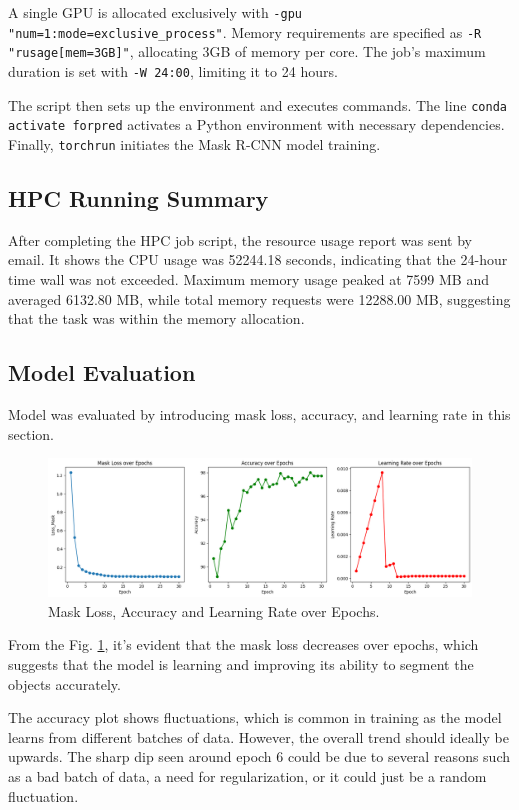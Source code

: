 A single GPU is allocated exclusively with \texttt{-gpu "num=1:mode=exclusive\_process"}. Memory requirements are specified as \texttt{-R "rusage[mem=3GB]"}, allocating 3GB of memory per core. The job's maximum duration is set with \texttt{-W 24:00}, limiting it to 24 hours.

The script then sets up the environment and executes commands. The line \texttt{conda activate forpred} activates a Python environment with necessary dependencies. Finally, \texttt{torchrun} initiates the Mask R-CNN model training.

\subsection{HPC Running Summary}
After completing the HPC job script, the resource usage report was sent by email. It shows the CPU usage was 52244.18 seconds, indicating that the 24-hour time wall was not exceeded. Maximum memory usage peaked at 7599 MB and averaged 6132.80 MB, while total memory requests were 12288.00 MB, suggesting that the task was within the memory allocation.

\subsection{Model Evaluation}

Model was evaluated by introducing mask loss, accuracy, and learning rate in this section.

\begin{figure}[H]
    \centering
    \includegraphics[width=.9\textwidth]{Pictures/maskrcnn/mask_loss_30.png}
    \caption{Mask Loss, Accuracy and Learning Rate over Epochs.}
    \label{fig:acc_train}
\end{figure}

From the Fig. \ref{fig:acc_train}, it's evident that the mask loss decreases over epochs, which suggests that the model is learning and improving its ability to segment the objects accurately.

The accuracy plot shows fluctuations, which is common in training as the model learns from different batches of data. However, the overall trend should ideally be upwards. The sharp dip seen around epoch 6 could be due to several reasons such as a bad batch of data, a need for regularization, or it could just be a random fluctuation.

